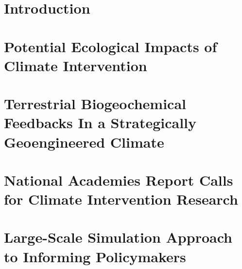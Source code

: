 \documentclass[landscape,custom]{sciposter}
\begin{document}
\begin{multicols}{4}

\section*{\large Introduction}



\section*{\large Potential Ecological Impacts of Climate Intervention}



\section*{\large Terrestrial Biogeochemical Feedbacks In a Strategically Geoengineered Climate}



\null\vskip0.30in

\section*{\large National Academies Report Calls for Climate Intervention Research}



\null\vskip0.30in

\section*{\large Large-Scale Simulation Approach to Informing Policymakers}


\end{multicols}
\end{document}
